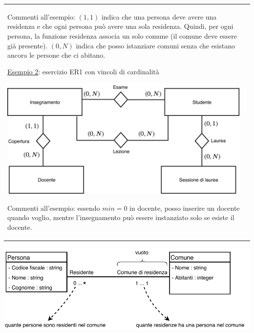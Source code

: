 \documentclass[a4paper, 10pt]{report}
\begin{document}
\begin{longtable}{| p{} | p{} |}
Commenti all'esempio: $(1, 1)$ indica che una persona deve avere una residenza e che ogni persona può avere una sola residenza. Quindi, per ogni persona, la funzione residenza associa un solo comune (il comune deve essere già presente).
$(0, N)$ indica che posso istanziare comuni senza che esistano ancora le persone che ci abitano.

\underline{Esempio 2}: esercizio ER1 con vincoli di cardinalità

\begin{center}
\includegraphics[scale=0.5]{15ottobre03.pdf}
\end{center}

Commenti all'esempio: essendo $min = 0$ in docente, posso inserire un docente quando voglio, mentre l'insegnamento può essere instanziato solo se esiste il docente.
\end{longtable}

\begin{tcolorbox}[title=\textbf{Esempio 1 in UML}]
\begin{center}
\includegraphics[scale=0.75]{15ottobre04.pdf}
\end{center}
\end{tcolorbox}
\end{document}
